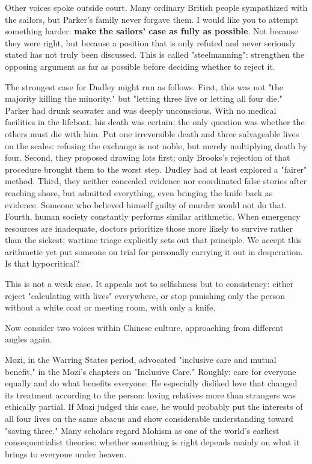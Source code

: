 Other voices spoke outside court. Many ordinary British people sympathized with the sailors, but Parker's family never forgave them. I would like you to attempt something harder: \textbf{make the sailors' case as fully as possible}. Not because they were right, but because a position that is only refuted and never seriously stated has not truly been discussed. This is called "steelmanning": strengthen the opposing argument as far as possible before deciding whether to reject it.

The strongest case for Dudley might run as follows. First, this was not "the majority killing the minority," but "letting three live or letting all four die." Parker had drunk seawater and was deeply unconscious. With no medical facilities in the lifeboat, his death was certain; the only question was whether the others must die with him. Put one irreversible death and three salvageable lives on the scales: refusing the exchange is not noble, but merely multiplying death by four. Second, they proposed drawing lots first; only Brooks's rejection of that procedure brought them to the worst step. Dudley had at least explored a "fairer" method. Third, they neither concealed evidence nor coordinated false stories after reaching shore, but admitted everything, even bringing the knife back as evidence. Someone who believed himself guilty of murder would not do that. Fourth, human society constantly performs similar arithmetic. When emergency resources are inadequate, doctors prioritize those more likely to survive rather than the sickest; wartime triage explicitly sets out that principle. We accept this arithmetic yet put someone on trial for personally carrying it out in desperation. Is that hypocritical?

This is not a weak case. It appeals not to selfishness but to consistency: either reject "calculating with lives" everywhere, or stop punishing only the person without a white coat or meeting room, with only a knife.

Now consider two voices within Chinese culture, approaching from different angles again.

Mozi, in the Warring States period, advocated "inclusive care and mutual benefit," in the Mozi's chapters on "Inclusive Care." Roughly: care for everyone equally and do what benefits everyone. He especially disliked love that changed its treatment according to the person: loving relatives more than strangers was ethically partial. If Mozi judged this case, he would probably put the interests of all four lives on the same abacus and show considerable understanding toward "saving three." Many scholars regard Mohism as one of the world's earliest consequentialist theories: whether something is right depends mainly on what it brings to everyone under heaven.

